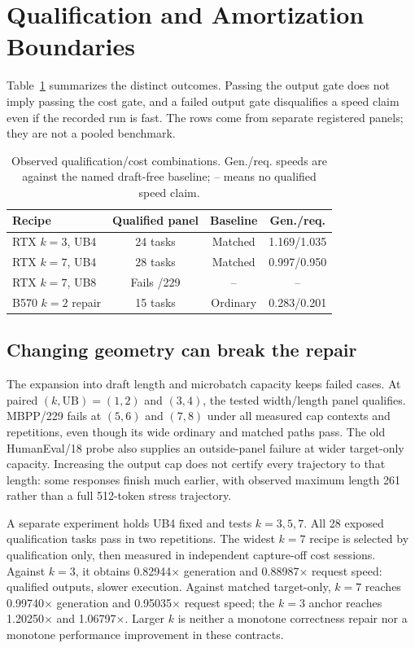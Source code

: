 \documentclass{article}
\begin{document}
\section{Qualification and Amortization Boundaries}
Table~\ref{tab:boundary} summarizes the distinct outcomes. Passing the output gate does not imply passing the cost gate, and a failed output gate disqualifies a speed claim even if the recorded run is fast. The rows come from separate registered panels; they are not a pooled benchmark.
\begin{table}[t]
\centering\footnotesize\setlength{\tabcolsep}{3pt}
\caption{Observed qualification/cost combinations. Gen./req. speeds are against the named draft-free baseline; -- means no qualified speed claim.}
\label{tab:boundary}
\begin{tabular}{lccc}\toprule
Recipe & Qualified panel & Baseline & Gen./req.\\\midrule
RTX $k=3$, UB4 & 24 tasks & Matched & 1.169/1.035\\
RTX $k=7$, UB4 & 28 tasks & Matched & 0.997/0.950\\
RTX $k=7$, UB8 & Fails /229 & -- & --\\
B570 $k=2$ repair & 15 tasks & Ordinary & 0.283/0.201\\\bottomrule
\end{tabular}\end{table}
\subsection{Changing geometry can break the repair}
The expansion into draft length and microbatch capacity keeps failed cases. At paired $(k,\mathrm{UB})=(1,2)$ and $(3,4)$, the tested width/length panel qualifies. MBPP/229 fails at $(5,6)$ and $(7,8)$ under all measured cap contexts and repetitions, even though its wide ordinary and matched paths pass. The old HumanEval/18 probe also supplies an outside-panel failure at wider target-only capacity. Increasing the output cap does not certify every trajectory to that length: some responses finish much earlier, with observed maximum length 261 rather than a full 512-token stress trajectory.

A separate experiment holds UB4 fixed and tests $k=3,5,7$. All 28 exposed qualification tasks pass in two repetitions. The widest $k=7$ recipe is selected by qualification only, then measured in independent capture-off cost sessions. Against $k=3$, it obtains 0.82944$\times$ generation and 0.88987$\times$ request speed: qualified outputs, slower execution. Against matched target-only, $k=7$ reaches 0.99740$\times$ generation and 0.95035$\times$ request speed; the $k=3$ anchor reaches 1.20250$\times$ and 1.06797$\times$. Larger $k$ is neither a monotone correctness repair nor a monotone performance improvement in these contracts.
\end{document}
